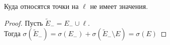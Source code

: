 \documentclass[11pt, oneside]{article}   	%
\begin{document}
        \begin{dlemma}
            Куда относятся точки на $\ell$ не имеет значения.\\
            \begin{proof}
                Пусть $\tilde{E}_{-} = E_{-} \cup \ell$.\\
                Тогда $\sigma(\tilde{E}_{-}) = \sigma(E_{-}) + \sigma(\tilde{E}_{-} \setminus E) = \sigma(E)$
            \end{proof}
        \end{dlemma}
        
\end{document}
